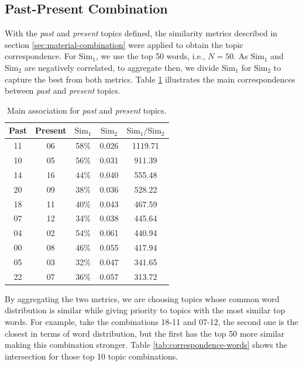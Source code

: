 \subsection{Past-Present Combination}

With the \textit{past} and \textit{present} topics defined, the similarity metrics described in section \ref{sec:material-combination} were applied to obtain the topic correspondence. For $\text{Sim}_{1}$, we use the top 50 words, i.e., $N=50$. As $\text{Sim}_{1}$ and $\text{Sim}_{2}$ are negatively correlated, to aggregate then, we divide $\text{Sim}_{1}$ for $\text{Sim}_{2}$ to capture the best from both metrics. Table \ref{tab:correspondence-score} illustrates the main correspondences between \textit{past} and \textit{present} topics.

\begin{table}[h!]
	\centering
	\caption{Main association for \textit{past} and \textit{present} topics.}
	\label{tab:correspondence-score}
	\begin{tabular}{cc|ccc}
		\toprule
		\textbf{Past} & \textbf{Present} & \textbf{$\text{Sim}_{1}$} & \textbf{$\text{Sim}_{2}$} & \textbf{$\text{Sim}_{1} / \text{Sim}_{2}$} \\ \midrule
		 11  &  06  & 58\% & 0.026 & 1119.71 \\
		 10  &  05  & 56\% & 0.031 & 911.39  \\
		 14  &  16  & 44\% & 0.040 & 555.48  \\
		 20  &  09  & 38\% & 0.036 & 528.22  \\
		 18  &  11  & 40\% & 0.043 & 467.59  \\
		 07  &  12  & 34\% & 0.038 & 445.64  \\
		 04  &  02  & 54\% & 0.061 & 440.94  \\
		 00  &  08  & 46\% & 0.055 & 417.94  \\
		 05  &  03  & 32\% & 0.047 & 341.65  \\
		 22  &  07  & 36\% & 0.057 & 313.72  \\ \bottomrule
	\end{tabular}
\end{table}

By aggregating the two metrics, we are choosing topics whose common word distribution is similar while giving priority to topics with the most similar top words. For example, take the combinations 18-11 and 07-12, the second one is the closest in terms of word distribution, but the first has the top 50 more similar making this combination stronger. Table \ref{tab:correspondence-words} shows the intersection for those top 10 topic combinations.

